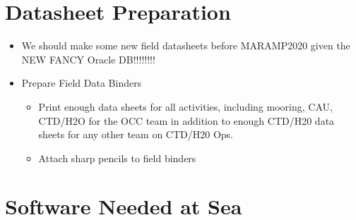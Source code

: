 \documentclass[]{book}
\providecommand{\tightlist}{%
  \setlength{\itemsep}{0pt}\setlength{\parskip}{0pt}}
\begin{document}
\hypertarget{datasheet-preparation}{%
\section{Datasheet Preparation}\label{datasheet-preparation}}

\begin{itemize}
\item
  We should make some new field datasheets before MARAMP2020 given the NEW FANCY Oracle DB!!!!!!!!
\item
  Prepare Field Data Binders

  \begin{itemize}
  \tightlist
  \item
    Print enough data sheets for all activities, including mooring, CAU, CTD/H2O for the OCC team in addition to enough CTD/H20 data sheets for any other team on CTD/H20 Ops.
  \item
    Attach sharp pencils to field binders
  \end{itemize}
\end{itemize}

\hypertarget{software-needed-at-sea}{%
\section{Software Needed at Sea}\label{software-needed-at-sea}}
\end{document}
